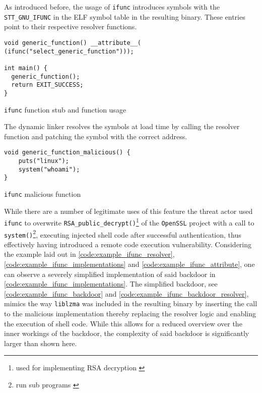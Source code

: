 As introduced before, the usage of \texttt{ifunc} introduces symbols with the
\texttt{STT\_GNU\_IFUNC} in the ELF symbol table in the resulting binary. These
entries point to their respective resolver functions.

\begin{listing}[H]
    \begin{verbatim}
void generic_function() __attribute__(
(ifunc("select_generic_function")));

int main() {
  generic_function();
  return EXIT_SUCCESS;
}
    \end{verbatim}
    \label{code:example_ifunc_attribute}
    \caption{\texttt{ifunc} function stub and function usage}
\end{listing}

The dynamic linker resolves the symbols at load time by calling the resolver
function and patching the symbol with the correct address. 

\begin{listing}[H]
    \begin{verbatim}
void generic_function_malicious() {
    puts("linux");
    system("whoami"); 
}
    \end{verbatim}
    \label{code:example_ifunc_backdoor}
    \caption{\texttt{ifunc} malicious function}
\end{listing}

While there are a number of legitimate uses of this feature the threat actor
used \texttt{ifunc} to overwrite \texttt{RSA\_public\_decrypt()}\footnote{used
for implementing RSA decryption \cite{openssl2022rsacrpt}} of the
\texttt{OpenSSL} project with a call to \texttt{system()}\footnote{run sub
programs \cite{gnu2023system}}, executing injected shell code after successful
authentication, thus effectively having introduced a remote code execution
vulnerability. 
Considering the example laid out in \autoref{code:example_ifunc_resolver},
\autoref{code:example_ifunc_implementations} and
\autoref{code:example_ifunc_attribute}, one can observe a severely simplified
implementation of said backdoor in
\autoref{code:example_ifunc_implementations}. The simplified backdoor, see
\autoref{code:example_ifunc_backdoor} and
\autoref{code:example_ifunc_backdoor_resolver}, mimics the way \texttt{liblzma}
was included in the resulting binary by inserting the call to the malicious
implementation thereby replacing the resolver logic and enabling the execution
of shell code. While this allows for a reduced overview over the inner workings
of the backdoor, the complexity of said backdoor is significantly larger than
shown here.

